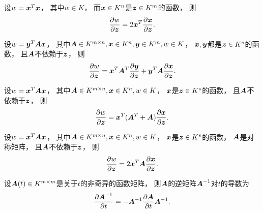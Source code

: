 \begin{corollary}
设\(w = \boldsymbol{x}^T \boldsymbol{x}\)，
其中\(w \in K\)，
而\(\boldsymbol{x} \in K^n\)是\(\boldsymbol{z} \in K^m\)的函数，
则\begin{equation*}
	\pdv{w}{\boldsymbol{z}}
	= 2 \boldsymbol{x}^T \pdv{\boldsymbol{x}}{\boldsymbol{z}}.
\end{equation*}
\end{corollary}

\begin{proposition}
设\(w = \boldsymbol{y}^T \boldsymbol{A} \boldsymbol{x}\)，
其中\(\boldsymbol{A} \in K^{m \times n}, \boldsymbol{x} \in K^n, \boldsymbol{y} \in K^m, w \in K\)，
\(\boldsymbol{x},\boldsymbol{y}\)都是\(\boldsymbol{z} \in K^s\)的函数，
且\(\boldsymbol{A}\)不依赖于\(\boldsymbol{z}\)，
则\begin{equation*}
	\pdv{w}{\boldsymbol{z}}
	= \boldsymbol{x}^T \boldsymbol{A}^T \pdv{\boldsymbol{y}}{\boldsymbol{z}}
	+ \boldsymbol{y}^T \boldsymbol{A} \pdv{\boldsymbol{x}}{\boldsymbol{z}}.
\end{equation*}
\end{proposition}

\begin{corollary}
设\(w = \boldsymbol{x}^T \boldsymbol{A} \boldsymbol{x}\)，
其中\(\boldsymbol{A} \in K^{m \times n}, \boldsymbol{x} \in K^n, w \in K\)，
\(\boldsymbol{x}\)是\(\boldsymbol{z} \in K^s\)的函数，
且\(\boldsymbol{A}\)不依赖于\(\boldsymbol{z}\)，
则\begin{equation*}
	\pdv{w}{\boldsymbol{z}}
	= \boldsymbol{x}^T (\boldsymbol{A}^T + \boldsymbol{A}) \pdv{\boldsymbol{x}}{\boldsymbol{z}}.
\end{equation*}
\end{corollary}

\begin{corollary}
设\(w = \boldsymbol{x}^T \boldsymbol{A} \boldsymbol{x}\)，
其中\(\boldsymbol{A} \in K^{m \times n}, \boldsymbol{x} \in K^n, w \in K\)，
\(\boldsymbol{x}\)是\(\boldsymbol{z} \in K^s\)的函数，
\(\boldsymbol{A}\)是对称矩阵，
且\(\boldsymbol{A}\)不依赖于\(\boldsymbol{z}\)，
则\begin{equation*}
	\pdv{w}{\boldsymbol{z}}
	= 2 \boldsymbol{x}^T \boldsymbol{A} \pdv{\boldsymbol{x}}{\boldsymbol{z}}.
\end{equation*}
\end{corollary}

\begin{proposition}
设\(\boldsymbol{A}(t) \in K^{m \times m}\)是关于\(t\)的非奇异的函数矩阵，
则\(\boldsymbol{A}\)的逆矩阵\(\boldsymbol{A}^{-1}\)对\(t\)的导数为\begin{equation*}
	\pdv{\boldsymbol{A}^{-1}}{t}
	= - \boldsymbol{A}^{-1} \pdv{\boldsymbol{A}}{t} \boldsymbol{A}^{-1}.
\end{equation*}
\end{proposition}

